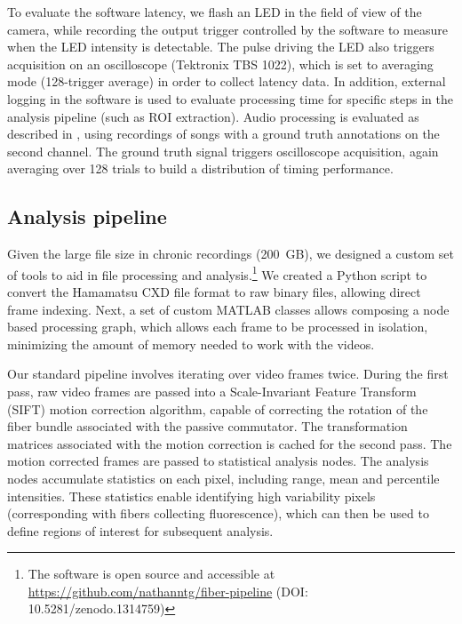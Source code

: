 To evaluate the software latency, we flash an LED in the 
field of view of the camera, while recording the output trigger 
controlled by the software to measure when the LED intensity is 
detectable. The pulse driving the LED also triggers acquisition on an 
oscilloscope (Tektronix TBS 1022), which is set to averaging mode (128-trigger average) 
in order to collect latency data. In addition, external logging
in the software is used to evaluate processing time for 
specific steps in the analysis pipeline (such as ROI extraction).
Audio processing is evaluated as described in \cite{Pearre:2017cs},
using recordings of songs with a ground truth annotations on the 
second channel. The ground truth signal triggers oscilloscope 
acquisition, again averaging over 128 trials to build a distribution 
of timing performance.

\subsection{Analysis pipeline}
\label{sec:pipeline}

Given the large file size in chronic recordings (200~GB), 
we designed a custom set of tools to aid in file 
processing and analysis.\footnote{The software is open 
source and accessible at 
\url{https://github.com/nathanntg/fiber-pipeline} (DOI: 10.5281/zenodo.1314759)} 
We created a Python script to 
convert the Hamamatsu CXD file format to raw binary files, 
allowing direct frame indexing. Next, a set of custom 
MATLAB classes allows composing a node based processing 
graph, which allows each frame to be processed in 
isolation, minimizing the amount of memory needed to work 
with the videos.

Our standard pipeline involves iterating over video frames 
twice. During the first pass, raw video frames are 
passed into a Scale-Invariant Feature Transform (SIFT) 
\cite{vedaldi08vlfeat,lowe1999object,Lowe:2004kp} 
motion correction algorithm, capable of correcting 
the rotation of the fiber bundle associated with the 
passive commutator. The transformation matrices 
associated with the motion correction is cached 
for the second pass. The motion corrected frames 
are passed to statistical analysis nodes. The analysis 
nodes accumulate statistics on each pixel, including 
range, mean and percentile intensities. These statistics 
enable identifying high variability pixels (corresponding 
with fibers collecting fluorescence), which can then 
be used to define regions of interest for subsequent 
analysis.

